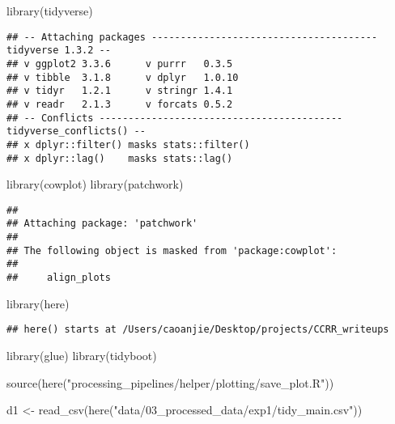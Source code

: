 \documentclass[
]{article}
\author{}
\date{\vspace{-2.5em}}
\newenvironment{Shaded}{\begin{snugshade}}{\end{snugshade}}
\newcommand{\FunctionTok}[1]{\textcolor[rgb]{0.00,0.00,0.00}{#1}}
\newcommand{\NormalTok}[1]{#1}
\newcommand{\OtherTok}[1]{\textcolor[rgb]{0.56,0.35,0.01}{#1}}
\newcommand{\StringTok}[1]{\textcolor[rgb]{0.31,0.60,0.02}{#1}}
\begin{document}
\begin{Shaded}
\begin{Highlighting}[]
\FunctionTok{library}\NormalTok{(tidyverse)}
\end{Highlighting}
\end{Shaded}

\begin{verbatim}
## -- Attaching packages --------------------------------------- tidyverse 1.3.2 --
## v ggplot2 3.3.6      v purrr   0.3.5 
## v tibble  3.1.8      v dplyr   1.0.10
## v tidyr   1.2.1      v stringr 1.4.1 
## v readr   2.1.3      v forcats 0.5.2 
## -- Conflicts ------------------------------------------ tidyverse_conflicts() --
## x dplyr::filter() masks stats::filter()
## x dplyr::lag()    masks stats::lag()
\end{verbatim}

\begin{Shaded}
\begin{Highlighting}[]
\FunctionTok{library}\NormalTok{(cowplot)}
\FunctionTok{library}\NormalTok{(patchwork)}
\end{Highlighting}
\end{Shaded}

\begin{verbatim}
## 
## Attaching package: 'patchwork'
## 
## The following object is masked from 'package:cowplot':
## 
##     align_plots
\end{verbatim}

\begin{Shaded}
\begin{Highlighting}[]
\FunctionTok{library}\NormalTok{(here)}
\end{Highlighting}
\end{Shaded}

\begin{verbatim}
## here() starts at /Users/caoanjie/Desktop/projects/CCRR_writeups
\end{verbatim}

\begin{Shaded}
\begin{Highlighting}[]
\FunctionTok{library}\NormalTok{(glue)}
\FunctionTok{library}\NormalTok{(tidyboot)}

\FunctionTok{source}\NormalTok{(}\FunctionTok{here}\NormalTok{(}\StringTok{"processing\_pipelines/helper/plotting/save\_plot.R"}\NormalTok{))}
\end{Highlighting}
\end{Shaded}

\begin{Shaded}
\begin{Highlighting}[]
\NormalTok{d1 }\OtherTok{\textless{}{-}} \FunctionTok{read\_csv}\NormalTok{(}\FunctionTok{here}\NormalTok{(}\StringTok{"data/03\_processed\_data/exp1/tidy\_main.csv"}\NormalTok{))}
\end{Highlighting}
\end{Shaded}
\end{document}
